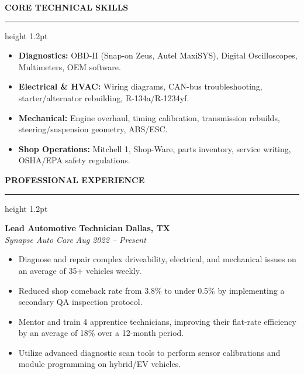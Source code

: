 \documentclass[10pt]{article}
\newcommand{\resumesection}[1]{%
  \vspace{6pt}%
  {\color{accent}\large\bfseries\MakeUppercase{#1}}%
  \vspace{1.5pt}%
  \hrule height 1.2pt%
  \vspace{3.5pt}%
}
\newcommand{\experience}[4]{%
  \vspace{3.5pt}%
  \noindent\textbf{#1} \hfill \textbf{#3} \\
  \noindent\textit{#2} \hfill \textit{#4} \\
  \vspace{1.5pt}%
}
\begin{document}
\resumesection{Core Technical Skills}
\begin{minipage}[t]{0.48\textwidth}
\begin{itemize}[leftmargin=10pt, topsep=0pt, itemsep=1.5pt, parsep=0pt]
    \item \textbf{Diagnostics:} OBD-II (Snap-on Zeus, Autel MaxiSYS), Digital Oscilloscopes, Multimeters, OEM software.
    \item \textbf{Electrical \& HVAC:} Wiring diagrams, CAN-bus troubleshooting, starter/alternator rebuilding, R-134a/R-1234yf.
\end{itemize}
\end{minipage}
\hfill
\begin{minipage}[t]{0.48\textwidth}
\begin{itemize}[leftmargin=10pt, topsep=0pt, itemsep=1.5pt, parsep=0pt]
    \item \textbf{Mechanical:} Engine overhaul, timing calibration, transmission rebuilds, steering/suspension geometry, ABS/ESC.
    \item \textbf{Shop Operations:} Mitchell 1, Shop-Ware, parts inventory, service writing, OSHA/EPA safety regulations.
\end{itemize}
\end{minipage}
\par

\resumesection{Professional Experience}

\experience{Lead Automotive Technician}{Synapse Auto Care}{Dallas, TX}{Aug 2022 -- Present}
\begin{itemize}[leftmargin=10pt, topsep=0pt, itemsep=1.5pt, parsep=0pt]
    \item Diagnose and repair complex driveability, electrical, and mechanical issues on an average of 35+ vehicles weekly.
    \item Reduced shop comeback rate from 3.8\% to under 0.5\% by implementing a secondary QA inspection protocol.
    \item Mentor and train 4 apprentice technicians, improving their flat-rate efficiency by an average of 18\% over a 12-month period.
    \item Utilize advanced diagnostic scan tools to perform sensor calibrations and module programming on hybrid/EV vehicles.
\end{itemize}
\end{document}
